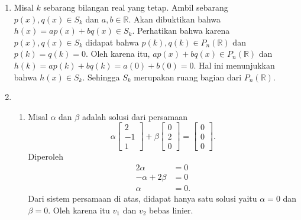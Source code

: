 \documentclass[11pt,letterpaper]{article}
\begin{document}
\begin{enumerate}
  \item Misal $k$ sebarang bilangan real yang tetap. Ambil sebarang $p(x), q(x) \in S_k$ dan $a,b \in \mathbb{R}$. Akan dibuktikan bahwa $h(x) = ap(x) + bq(x) \in S_k$. Perhatikan bahwa karena $p(x), q(x) \in S_k$ didapat bahwa $p(k), q(k) \in P_n(\mathbb{R})$ dan $p(k) = q(k) = 0$. Oleh karena itu, $ap(x) + bq(x) \in P_n(\mathbb{R})$ dan $h(k) = ap(k) + bq(k) = a(0) + b(0) = 0$. Hal ini menunjukkan bahwa $h(x) \in S_k$. Sehingga $S_k$ merupakan ruang bagian dari $P_n(\mathbb{R})$.

  \item
        \begin{enumerate}
          \item Misal $\alpha$ dan $\beta$ adalah solusi dari persamaan
                \[
                  \alpha
                  \begin{bmatrix}
                    2 \\ -1 \\ 1
                  \end{bmatrix}
                  +
                  \beta
                  \begin{bmatrix}
                    0 \\ 2 \\ 0
                  \end{bmatrix}
                  =
                  \begin{bmatrix}
                    0 \\ 0 \\ 0
                  \end{bmatrix}.
                \]
                Diperoleh
                \[
                  \begin{aligned}
                    2\alpha          & = 0  \\
                    -\alpha + 2\beta & = 0  \\
                    \alpha           & = 0.
                  \end{aligned}
                \]
                Dari sistem persamaan di atas, didapat hanya satu solusi yaitu $\alpha = 0$ dan $\beta = 0$. Oleh karena itu $v_1$ dan $v_2$ bebas linier.


\end{enumerate}
\end{enumerate}
\end{document}
